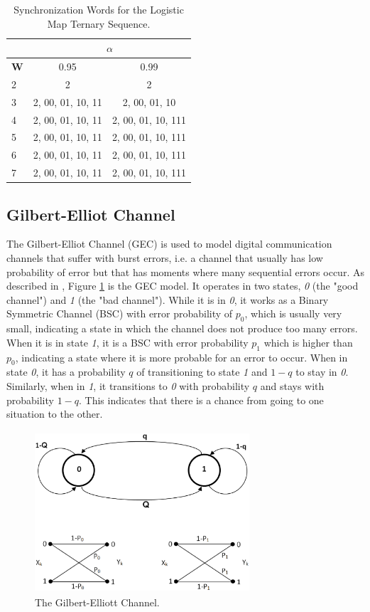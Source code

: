 {\begin{table}
\centering
\caption{Synchronization Words for the Logistic Map Ternary Sequence. \label{tab:lmapsynch}}
\begin{tabular}{|l|c|c|}
\hline
 & \multicolumn{2}{c|}{\textbf{$\alpha$}}\\
 \hline
\textbf{W} & 0.95 & 0.99 \\
\hline
2 & 2 & 2 \\ 
3 & 2, 00, 01, 10, 11 & 2, 00, 01, 10 \\ 
4 & 2, 00, 01, 10, 11 & 2, 00, 01, 10, 111 \\ 
5 & 2, 00, 01, 10, 11 & 2, 00, 01, 10, 111 \\
6 & 2, 00, 01, 10, 11 & 2, 00, 01, 10, 111 \\ 
7 & 2, 00, 01, 10, 11 & 2, 00, 01, 10, 111 \\ 
 \hline
\end{tabular}
\end{table}

\subsection{Gilbert-Elliot Channel}

The Gilbert-Elliot Channel (GEC) is used to model digital communication channels that suffer with burst errors, i.e. a channel that usually has low probability of error but that has moments where many sequential errors occur. As described in \cite{mushkin.89}, Figure \ref{fig:gec} is the GEC model. It operates in two states, \textit{0} (the "good channel") and \textit{1} (the "bad channel"). While it is in \textit{0}, it works as a Binary Symmetric Channel (BSC) with error probability of $p_0$, which is usually very small, indicating a state in which the channel does not produce too many errors. When it is in state \textit{1}, it is a BSC with error probability $p_1$ which is higher than $p_0$, indicating a state where it is more probable for an error to occur. When in state \textit{0}, it has a probability $q$ of transitioning to state \textit{1} and $1-q$ to stay in \textit{0}. Similarly, when in \textit{1}, it transitions to \textit{0} with probability $q$ and stays with probability $1-q$. This indicates that there is a chance from going to one situation to the other.

\begin{figure}
\centering
\includegraphics[width=8cm, height=6cm]{Figuras/figgec.eps}
\caption{\label{fig:gec} The Gilbert-Elliott Channel.}
\end{figure}

}
